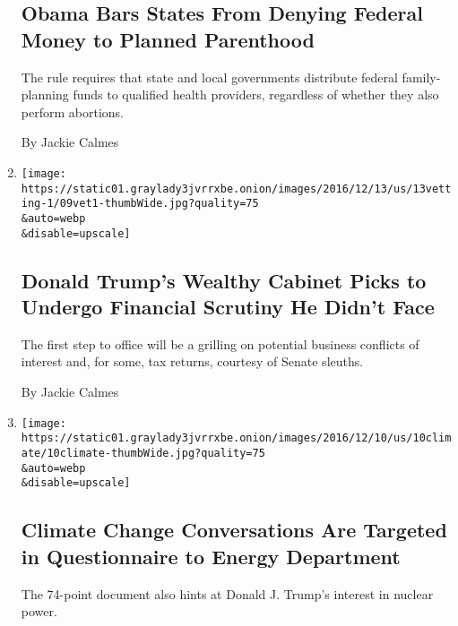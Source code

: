 \begin{enumerate}
  \hypertarget{obama-bars-states-from-denying-federal-money-to-planned-parenthood}{%
  \subsection{Obama Bars States From Denying Federal Money to Planned
  Parenthood}\label{obama-bars-states-from-denying-federal-money-to-planned-parenthood}}

  The rule requires that state and local governments distribute federal
  family-planning funds to qualified health providers, regardless of
  whether they also perform abortions.

  By Jackie Calmes
\item
  \href{/2016/12/12/us/politics/donald-trump-cabinet.html}{}

  \texttt{[image: https://static01.graylady3jvrrxbe.onion/images/2016/12/13/us/13vetting-1/09vet1-thumbWide.jpg?quality=75\\\&auto=webp\\\&disable=upscale]}

  \hypertarget{donald-trumps-wealthy-cabinet-picks-to-undergo-financial-scrutiny-he-didnt-face}{%
  \subsection{Donald Trump's Wealthy Cabinet Picks to Undergo Financial
  Scrutiny He Didn't
  Face}\label{donald-trumps-wealthy-cabinet-picks-to-undergo-financial-scrutiny-he-didnt-face}}

  The first step to office will be a grilling on potential business
  conflicts of interest and, for some, tax returns, courtesy of Senate
  sleuths.

  By Jackie Calmes
\item
  \href{/2016/12/09/us/politics/climate-change-energy-department-donald-trump-transition.html}{}

  \texttt{[image: https://static01.graylady3jvrrxbe.onion/images/2016/12/10/us/10climate/10climate-thumbWide.jpg?quality=75\\\&auto=webp\\\&disable=upscale]}

  \hypertarget{climate-change-conversations-are-targeted-in-questionnaire-to-energy-department}{%
  \subsection{Climate Change Conversations Are Targeted in Questionnaire
  to Energy
  Department}\label{climate-change-conversations-are-targeted-in-questionnaire-to-energy-department}}

  The 74-point document also hints at Donald J. Trump's interest in
  nuclear power.


\end{enumerate}
